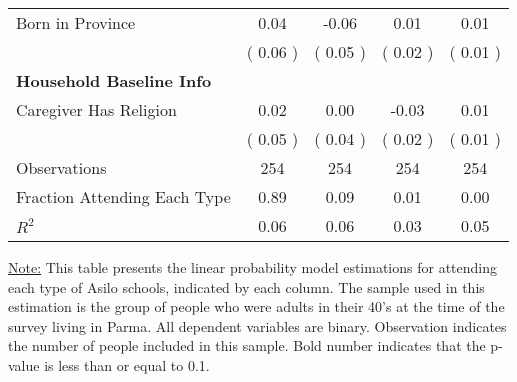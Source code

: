 \begin{table}[H]
{\begin{tabular}{lcccc}
\quad Born in Province &      0.04 &     -0.06 &      0.01 &      0.01 \\
\quad  & (     0.06 ) & (     0.05 )  & (     0.02 )  & (     0.01 )  \\
\midrule
\textbf{Household Baseline Info} \\
\quad Caregiver Has Religion &      0.02 &      0.00 &     -0.03 &      0.01 \\
\quad  & (     0.05 ) & (     0.04 )  & (     0.02 )  & (     0.01 )  \\
\midrule
Observations & 254 & 254 & 254 & 254 \\
Fraction Attending Each Type &      0.89 &      0.09 &      0.01 &      0.00 \\
\midrule
$ R^2$ &      0.06 &      0.06 &      0.03 &      0.05 \\
\bottomrule
\end{tabular}}
\end{table}
\begin{footnotesize}
\noindent\underline{Note:} This table presents the linear probability model estimations for attending each type of Asilo schools, indicated by each column. The sample used in this estimation is the group of people who were adults in their 40's at the time of the survey living in Parma. All dependent variables are binary. Observation indicates the number of people included in this sample. Bold number indicates that the p-value is less than or equal to 0.1.
\end{footnotesize}
